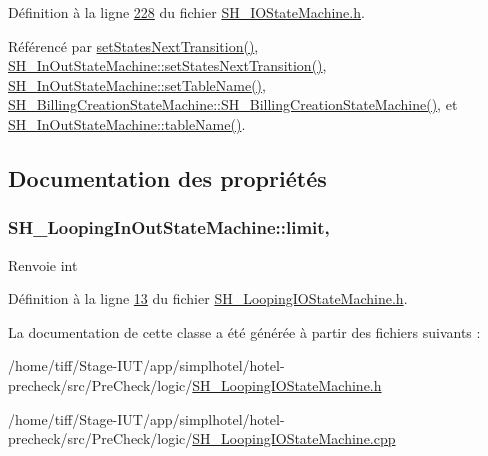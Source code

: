 Définition à la ligne \hyperlink{SH__IOStateMachine_8h_source_l00228}{228} du fichier \hyperlink{SH__IOStateMachine_8h_source}{S\-H\-\_\-\-I\-O\-State\-Machine.\-h}.



Référencé par \hyperlink{classSH__LoopingInOutStateMachine_a0ee122553641721012f3710e71cce234}{set\-States\-Next\-Transition()}, \hyperlink{classSH__InOutStateMachine_a70d6d81c0a8d4afd6aab0a7239edc237}{S\-H\-\_\-\-In\-Out\-State\-Machine\-::set\-States\-Next\-Transition()}, \hyperlink{classSH__InOutStateMachine_a95db31a7e7f31f36a8737adc739ab08c}{S\-H\-\_\-\-In\-Out\-State\-Machine\-::set\-Table\-Name()}, \hyperlink{classSH__BillingCreationStateMachine_ad62b77fa4aeafe200056ff3974562f83}{S\-H\-\_\-\-Billing\-Creation\-State\-Machine\-::\-S\-H\-\_\-\-Billing\-Creation\-State\-Machine()}, et \hyperlink{classSH__InOutStateMachine_a4288a6c86ddf83effefff886675591c9}{S\-H\-\_\-\-In\-Out\-State\-Machine\-::table\-Name()}.



\subsection{Documentation des propriétés}
\hypertarget{classSH__LoopingInOutStateMachine_a7b61682544bd06b52020df3e0d801d21}{
\subsubsection[{limit}]{\setlength{\rightskip}{0pt plus 5cm}S\-H\-\_\-\-Looping\-In\-Out\-State\-Machine\-::limit\hspace{0.3cm}{\ttfamily [read]}, {\ttfamily [write]}}}\label{classSH__LoopingInOutStateMachine_a7b61682544bd06b52020df3e0d801d21}
\begin{DoxyReturn}{Renvoie}
int 
\end{DoxyReturn}


Définition à la ligne \hyperlink{SH__LoopingIOStateMachine_8h_source_l00013}{13} du fichier \hyperlink{SH__LoopingIOStateMachine_8h_source}{S\-H\-\_\-\-Looping\-I\-O\-State\-Machine.\-h}.



La documentation de cette classe a été générée à partir des fichiers suivants \-:\begin{DoxyCompactItemize}
\item 
/home/tiff/\-Stage-\/\-I\-U\-T/app/simplhotel/hotel-\/precheck/src/\-Pre\-Check/logic/\hyperlink{SH__LoopingIOStateMachine_8h}{S\-H\-\_\-\-Looping\-I\-O\-State\-Machine.\-h}\item 
/home/tiff/\-Stage-\/\-I\-U\-T/app/simplhotel/hotel-\/precheck/src/\-Pre\-Check/logic/\hyperlink{SH__LoopingIOStateMachine_8cpp}{S\-H\-\_\-\-Looping\-I\-O\-State\-Machine.\-cpp}\end{DoxyCompactItemize}
